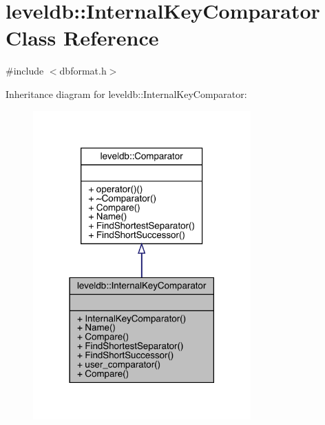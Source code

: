 \hypertarget{classleveldb_1_1_internal_key_comparator}{}\section{leveldb\+::Internal\+Key\+Comparator Class Reference}
\label{classleveldb_1_1_internal_key_comparator}


{\ttfamily \#include $<$dbformat.\+h$>$}



Inheritance diagram for leveldb\+::Internal\+Key\+Comparator\+:
\nopagebreak
\begin{figure}[H]
\begin{center}
\leavevmode
\includegraphics[width=237pt]{classleveldb_1_1_internal_key_comparator__inherit__graph}
\end{center}
\end{figure}



